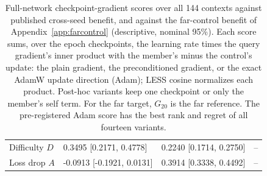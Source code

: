 \begin{table}[tp]
{\begin{tabular}{@{}llll@{}}
Difficulty $D$ & 0.3495 [0.2171, 0.4778] & 0.2240 [0.1714, 0.2750] & -- \\
Loss drop $A$ & -0.0913 [-0.1921, 0.0131] & 0.3914 [0.3338, 0.4492] & -- \\
\bottomrule
\end{tabular}}
\caption{Full-network checkpoint-gradient scores over all 144 contexts against published cross-seed benefit, and against the far-control benefit of Appendix~\ref{app:farcontrol} (descriptive, nominal 95\%). Each score sums, over the epoch checkpoints, the learning rate times the query gradient's inner product with the member's minus the control's update: the plain gradient, the preconditioned gradient, or the exact AdamW update direction (Adam); LESS cosine normalizes each product. Post-hoc variants keep one checkpoint or only the member's self term. For the far target, $G_{20}$ is the far reference. The pre-registered Adam score has the best rank and regret of all fourteen variants.}
\label{tab:e06_gradient}
\end{table}
